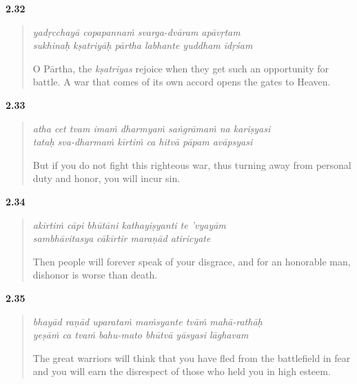 \par\noindent\textbf{2.32}\par
\begin{verse}
\textit{yadṛcchayā copapannaṁ svarga-dvāram apāvṛtam} \\
\textit{sukhinaḥ kṣatriyāḥ pārtha labhante yuddham īdṛśam}

\noindent O Pārtha, the \textit{kṣatriyas} rejoice when they get such an opportunity for battle. A war that comes of its own accord opens the gates to Heaven.
\end{verse}
\par



\par\noindent\textbf{2.33}\par
\begin{verse}
\textit{atha cet tvam imaṁ dharmyaṁ saṅgrāmaṁ na kariṣyasi} \\
\textit{tataḥ sva-dharmaṁ kīrtiṁ ca hitvā pāpam avāpsyasi}

\noindent But if you do not fight this righteous war, thus turning away from personal duty and honor, you will incur sin.
\end{verse}
\par



\par\noindent\textbf{2.34}\par
\begin{verse}
\textit{akīrtiṁ cāpi bhūtāni kathayiṣyanti te ’vyayām} \\
\textit{sambhāvitasya cākīrtir maraṇād atiricyate}

\noindent Then people will forever speak of your disgrace, and for an honorable man, dishonor is worse than death.
\end{verse}
\par



\par\noindent\textbf{2.35}\par
\begin{verse}
\textit{bhayād raṇād uparataṁ maṁsyante tvāṁ mahā-rathāḥ} \\
\textit{yeṣāṁ ca tvaṁ bahu-mato bhūtvā yāsyasi lāghavam}

\noindent The great warriors will think that you have fled from the battlefield in fear and you will earn the disrespect of those who held you in high esteem.
\end{verse}
\par



